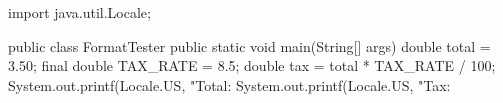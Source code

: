 \begin{unipdcode}[language=Java]
import java.util.Locale;

public class FormatTester {
    public static void main(String[] args) {
        double total = 3.50;
        final double TAX_RATE = 8.5;
        double tax = total * TAX_RATE / 100;
        System.out.printf(Locale.US, "Total:%
        System.out.printf(Locale.US, "Tax:  %
    }
}
\end{unipdcode}
